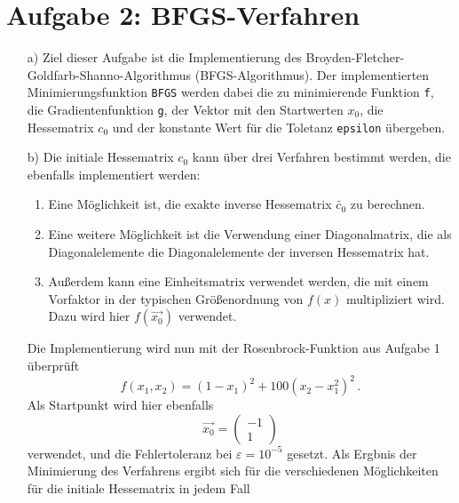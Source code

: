 \section*{Aufgabe 2: BFGS-Verfahren}
\begin{itemize}[leftmargin=*]
\item[a)] Ziel dieser Aufgabe ist die Implementierung des Broyden-Fletcher-Goldfarb-Shanno-Algorithmus
          (BFGS-Algorithmus). Der implementierten Minimierungsfunktion \texttt{BFGS} werden dabei die zu minimierende Funktion \texttt{f}, die Gradientenfunktion \texttt{g}, der Vektor mit den Startwerten \texttt{$x_0$}, die Hessematrix \texttt{$c_0$} und der konstante Wert für die Toletanz \texttt{epsilon}
          übergeben.
\item[b)] Die initiale Hessematrix \texttt{$c_0$} kann über drei Verfahren bestimmt werden, die ebenfalls
          implementiert werden:
          \begin{enumerate}
            \item Eine Möglichkeit ist, die exakte inverse Hessematrix $\tilde{c_0}$ zu berechnen.
            \item Eine weitere Möglichkeit ist die Verwendung einer Diagonalmatrix, die als Diagonalelemente
                  die Diagonalelemente der inversen Hessematrix hat.
            \item Außerdem kann eine Einheitsmatrix verwendet werden, die mit einem Vorfaktor in der typischen
                  Größenordnung von $f(x)$ multipliziert wird. Dazu wird hier $f(\vec{x_0})$ verwendet.
          \end{enumerate}
          Die Implementierung wird nun mit der Rosenbrock-Funktion aus Aufgabe 1 überprüft
          \begin{equation*}
            f\left(x_1, x_2\right) = \left(1 - x_1\right)^2 + 100 \left(x_2 - x_1^2\right)^2 \, .
          \end{equation*}
          Als Startpunkt wird hier ebenfalls
          \begin{equation*}
            \vec{x_0} = \begin{pmatrix}
              -1 \\
              1
          \end{pmatrix}
          \end{equation*}
          verwendet, und die Fehlertoleranz bei $\varepsilon = 10^{-5}$ gesetzt.
          Als Ergbnis der Minimierung des Verfahrens ergibt sich für die verschiedenen Möglichkeiten für die
          initiale Hessematrix in jedem Fall

\end{itemize}
